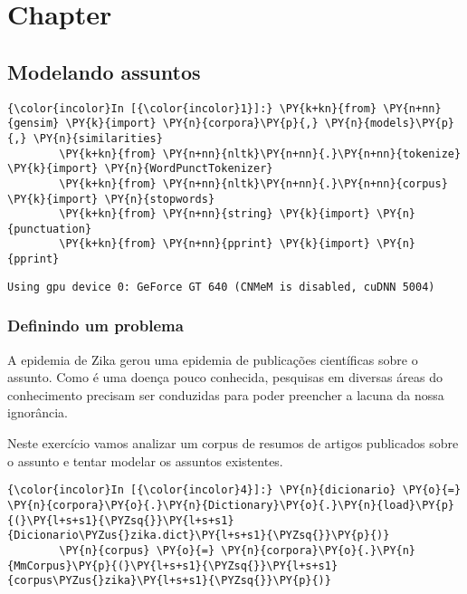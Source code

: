 \chapter{Chapter}

    
    

    
    \section{Modelando assuntos}\label{modelando-assuntos}

    \begin{Verbatim}[commandchars=\\\{\}]
{\color{incolor}In [{\color{incolor}1}]:} \PY{k+kn}{from} \PY{n+nn}{gensim} \PY{k}{import} \PY{n}{corpora}\PY{p}{,} \PY{n}{models}\PY{p}{,} \PY{n}{similarities}
        \PY{k+kn}{from} \PY{n+nn}{nltk}\PY{n+nn}{.}\PY{n+nn}{tokenize} \PY{k}{import} \PY{n}{WordPunctTokenizer}
        \PY{k+kn}{from} \PY{n+nn}{nltk}\PY{n+nn}{.}\PY{n+nn}{corpus} \PY{k}{import} \PY{n}{stopwords}
        \PY{k+kn}{from} \PY{n+nn}{string} \PY{k}{import} \PY{n}{punctuation}
        \PY{k+kn}{from} \PY{n+nn}{pprint} \PY{k}{import} \PY{n}{pprint}
\end{Verbatim}

    \begin{Verbatim}[commandchars=\\\{\}]
Using gpu device 0: GeForce GT 640 (CNMeM is disabled, cuDNN 5004)

    \end{Verbatim}

    \subsection{Definindo um problema}\label{definindo-um-problema}

A epidemia de Zika gerou uma epidemia de publicações científicas sobre o
assunto. Como é uma doença pouco conhecida, pesquisas em diversas áreas
do conhecimento precisam ser conduzidas para poder preencher a lacuna da
nossa ignorância.

Neste exercício vamos analizar um corpus de resumos de artigos
publicados sobre o assunto e tentar modelar os assuntos existentes.

    \begin{Verbatim}[commandchars=\\\{\}]
{\color{incolor}In [{\color{incolor}4}]:} \PY{n}{dicionario} \PY{o}{=} \PY{n}{corpora}\PY{o}{.}\PY{n}{Dictionary}\PY{o}{.}\PY{n}{load}\PY{p}{(}\PY{l+s+s1}{\PYZsq{}}\PY{l+s+s1}{Dicionario\PYZus{}zika.dict}\PY{l+s+s1}{\PYZsq{}}\PY{p}{)}
        \PY{n}{corpus} \PY{o}{=} \PY{n}{corpora}\PY{o}{.}\PY{n}{MmCorpus}\PY{p}{(}\PY{l+s+s1}{\PYZsq{}}\PY{l+s+s1}{corpus\PYZus{}zika}\PY{l+s+s1}{\PYZsq{}}\PY{p}{)}
\end{Verbatim}

